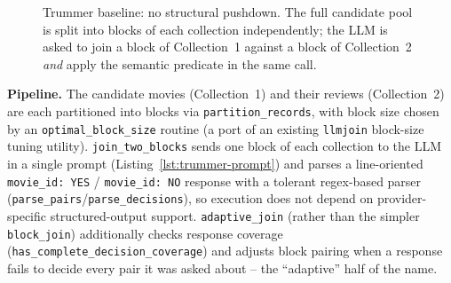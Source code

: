 \begin{figure}[h]
\centering
{}
\caption{Trummer baseline: no structural pushdown. The full candidate
pool is split into blocks of each collection independently; the LLM is
asked to join a block of Collection~1 against a block of Collection~2
\emph{and} apply the semantic predicate in the same call.}
\label{fig:trummer-baseline}
\end{figure}

\textbf{Pipeline.} The candidate movies (Collection~1) and their reviews
(Collection~2) are each partitioned into blocks via
\texttt{partition\_records}, with block size chosen by an
\texttt{optimal\_block\_size} routine (a port of an existing
\texttt{llmjoin} block-size tuning utility). \texttt{join\_two\_blocks}
sends one block of each collection to the LLM in a single prompt
(Listing~\ref{lst:trummer-prompt}) and parses a line-oriented
\texttt{movie\_id: YES} / \texttt{movie\_id: NO} response with a
tolerant regex-based parser (\texttt{parse\_pairs}/\texttt{parse\_decisions}),
so execution does not depend on provider-specific structured-output
support. \texttt{adaptive\_join} (rather than the simpler
\texttt{block\_join}) additionally checks response coverage
(\texttt{has\_complete\_decision\_coverage}) and adjusts block pairing
when a response fails to decide every pair it was asked about -- the
``adaptive'' half of the name.

